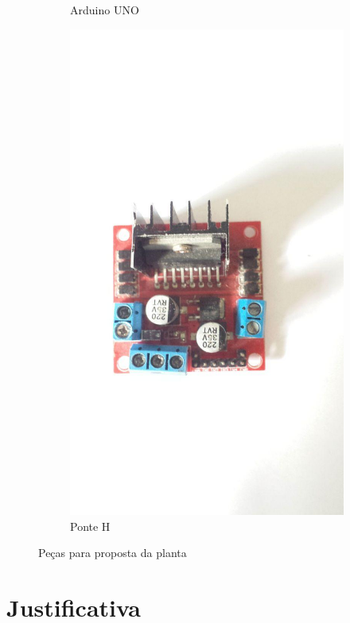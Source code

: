 \documentclass[a4paper,11pt]{article}
\begin{document}
\begin{figure}[H]
\begin{subfigure}[b]{0.32\linewidth}
        \caption{Arduino UNO}
    \end{subfigure}
    \hfill
    \begin{subfigure}[b]{0.32\linewidth}
        \centering
        \includegraphics[width=0.9\linewidth]{src/tex/img/ponteH.jpg}
        \caption{Ponte H}
    \end{subfigure}
    \label{fig:dispositivos}
    \caption{Peças para proposta da planta}
\end{figure}

\section{Justificativa}
\end{document}
